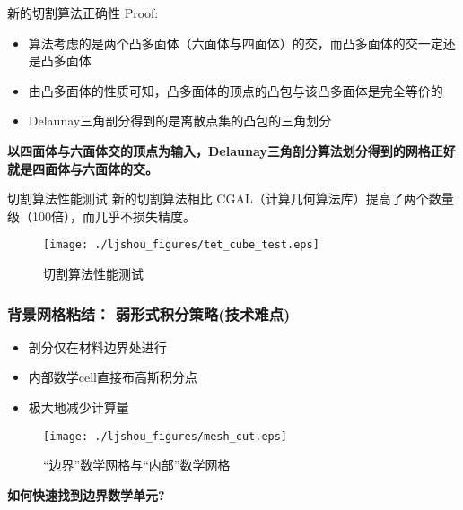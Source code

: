 \documentclass[mathserif]{beamer}
\begin{document}
\begin{CJK}{UTF8}{gkai}
		\begin{frame}{新的切割算法正确性}
		    Proof:
		    \begin{itemize}
    		    \item 算法考虑的是两个凸多面体（六面体与四面体）的交，而凸多面体的交一定还是凸多面体
    		    \item 由凸多面体的性质可知，凸多面体的顶点的凸包与该凸多面体是完全等价的
    		    \item Delaunay三角剖分得到的是离散点集的凸包的三角划分
		    \end{itemize}
		    \begin{block}{}
		    \color{red}\bf 以四面体与六面体交的顶点为输入，Delaunay三角剖分算法划分得到的网格正好就是四面体与六面体的交。
	        \end{block}
		\end{frame}
		
		\begin{frame}{切割算法性能测试}
		新的切割算法相比 CGAL（计算几何算法库）{\color{red}提高了两个数量级（100倍）}，而几乎不损失精度。
			\begin{figure}
				\centering
				\texttt{[image: ./ljshou\_figures/tet\_cube\_test.eps]}
				\caption{切割算法性能测试}
			\end{figure}
		\end{frame}
		
		\begin{frame}
			\frametitle{背景网格粘结： 弱形式积分策略(技术难点)}
			\begin{itemize}
				\item 剖分仅在材料边界处进行
				\item 内部数学cell直接布高斯积分点
  				\item 极大地减少计算量
			\end{itemize}
			\begin{figure}
					\centering
			    	\texttt{[image: ./ljshou\_figures/mesh\_cut.eps]}
					\caption{“边界”数学网格与“内部”数学网格}
			\end{figure}
			\begin{block}{}
				\bf \color{blue} 如何快速找到边界数学单元?
			\end{block}
		\end{frame}
        

\end{CJK}
\end{document}
